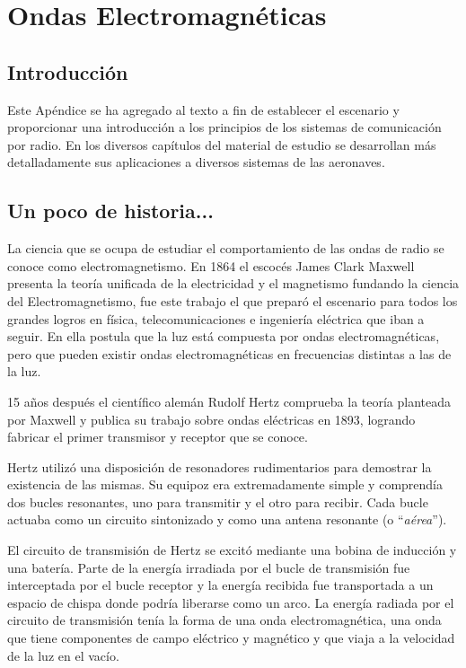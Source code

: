 
\chapter{Ondas Electromagn\'eticas}
\label{sec:ondas.electromagneticas}

\section{Introducci\'on}
\label{sec:A.00.introduccion}

Este Ap\'endice se ha agregado al texto a fin de 
establecer el escenario y proporcionar una introducción a los principios de los sistemas de comunicación por radio. 
En los diversos cap\'itulos del material de estudio se desarrollan m\'as detalladamente sus aplicaciones a diversos sistemas de las aeronaves.



\section{Un poco de historia...}
\label{sec:A.01.un.poco.de.historia}

La ciencia que se ocupa de estudiar el comportamiento de las ondas de radio se conoce como electromagnetismo. En 1864 el escoc\'es James Clark Maxwell presenta la teoría unificada de la electricidad y el magnetismo fundando la ciencia del Electromagnetismo, fue este trabajo el que preparó el escenario para todos los grandes logros en física, telecomunicaciones e ingeniería eléctrica que iban a seguir. En ella postula que la luz está compuesta por ondas electromagnéticas, pero que pueden existir ondas electromagnéticas en frecuencias distintas a las de la luz. 


15 años después el científico alemán Rudolf Hertz comprueba la teoría planteada por Maxwell y publica su trabajo sobre ondas eléctricas en 1893, logrando fabricar el primer transmisor y receptor que se conoce.

Hertz utilizó una disposición de resonadores rudimentarios para demostrar la existencia de las mismas. Su equipoz era extremadamente simple y comprendía dos bucles resonantes, uno para transmitir y el otro para recibir. Cada bucle actuaba como un circuito sintonizado y como una antena resonante (o ``\emph{aérea}'').

El circuito de transmisión de Hertz se excitó mediante una bobina de inducción y una batería. Parte de la energía irradiada por el bucle de transmisión fue interceptada por el bucle receptor y la energía recibida fue transportada a un espacio de chispa donde podría liberarse como un arco. La energía radiada por el circuito de transmisión tenía la forma de una onda electromagnética, una onda que tiene componentes de campo eléctrico y magnético y que viaja a la velocidad de la luz en el vac\'io.


